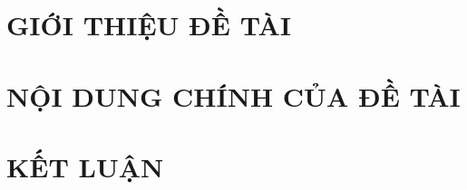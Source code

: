 \documentclass[a4paper,13pt]{report}
\renewcommand{\bibname}{Danh_sach_tai_lieu_tham_khao}
\theoremstyle{definition}
\begin{document}
\glsaddall 
\renewcommand*{\acronymname}{DANH MỤC THUẬT NGỮ VÀ TỪ VIẾT TẮT}
\renewcommand*{\entryname}{Thuật ngữ}
\renewcommand*{\descriptionname}{Ý nghĩa}
\printnoidxglossaries

\renewcommand\appendixname{PHỤ LỤC}
\renewcommand\appendixpagename{PHỤ LỤC}
\renewcommand\appendixtocname{PHỤ LỤC}





\newpage
\pagestyle{fancy}
\fancyhf{}
\fancyhead[L]{\leftmark}
\fancyfoot[R]{\thepage}

\chapter{GIỚI THIỆU ĐỀ TÀI}


\newpage
\chapter{NỘI DUNG CHÍNH CỦA ĐỀ TÀI}



\newpage
\chapter{KẾT LUẬN}


\newpage
\renewcommand\bibname{TÀI LIỆU THAM KHẢO}
\nocite{rnt_esp32_pinout,components101_mq135,hivemq_mqtt,freertos_api}
\printbibliography
{}
\end{document}
